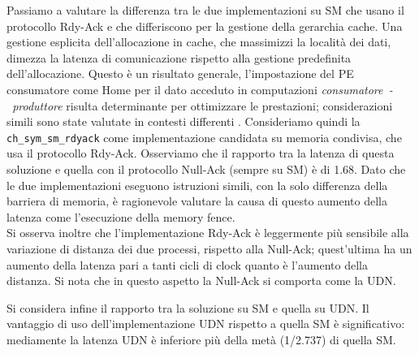 Passiamo a valutare la differenza tra le due implementazioni su SM che usano il protocollo Rdy-Ack e che differiscono per la gestione della gerarchia cache. Una gestione esplicita dell'allocazione in cache, che massimizzi la localit\`a dei dati, dimezza la latenza di comunicazione rispetto alla gestione predefinita dell'allocazione. Questo \`e un risultato generale, l'impostazione del PE consumatore come Home per il dato acceduto in computazioni \emph{consumatore~-~produttore} risulta determinante per ottimizzare le prestazioni; considerazioni simili sono state valutate in contesti differenti \cite{buono2013parallel}. Consideriamo quindi la \verb+ch_sym_sm_rdyack+ come implementazione candidata su memoria condivisa, che usa il protocollo Rdy-Ack. Osserviamo che il rapporto tra la latenza di questa soluzione e quella con il protocollo Null-Ack (sempre su SM) \`e di 1.68. Dato che le due implementazioni eseguono istruzioni simili, con la solo differenza della barriera di memoria, \`e ragionevole valutare la causa di questo aumento della latenza come l'esecuzione della memory fence.\\
Si osserva inoltre che l'implementazione Rdy-Ack \`e leggermente pi\`u sensibile alla variazione di distanza dei due processi, rispetto alla Null-Ack; quest'ultima ha un aumento della latenza pari a tanti cicli di clock quanto \`e l'aumento della distanza. Si nota che in questo aspetto la Null-Ack si comporta come la UDN. 

Si considera infine il rapporto tra la soluzione su SM e quella su UDN. Il vantaggio di uso dell'implementazione UDN rispetto a quella SM \`e significativo: mediamente la latenza UDN \`e inferiore pi\`u della met\`a (1/2.737) di quella SM. 

